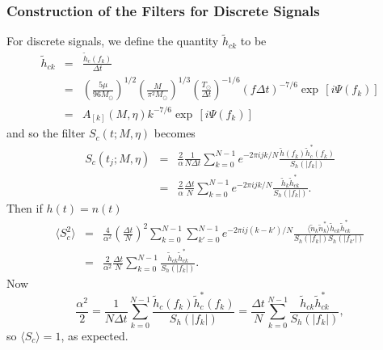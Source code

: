 \subsubsection*{Construction of the Filters for Discrete Signals}

For discrete signals, we define the quantity $\tilde{h}_{ck}$ to be
\begin{eqnarray}
\nonumber
\tilde{h}_{ck} &=& \frac{\tilde{h}_c(f_k)}{\Delta t} \\
\nonumber
&=& 
\left(\frac{5\mu}{96M_\odot}\right)^{1/2}
\left(\frac{M}{\pi^2M_\odot}\right)^{1/3}
\left(\frac {T_\odot}{\Delta t}\right)^{-1/6}
\left(f \Delta t\right)^{-7/6}
\exp\,[i\Psi(f_k)]\\
&=&  
A_{[k]}(M,\eta) k^{-7/6} \exp\,[i\Psi(f_k)]
\end{eqnarray}
and so the filter $S_c(t;M,\eta)$ becomes
\begin{eqnarray}
\nonumber
S_c(t_j;M,\eta) &=& \frac{2}{\alpha} \frac{1}{N\Delta t}
  \sum_{k=0}^{N-1} e^{-2\pi ijk/N} 
  \frac{\tilde{h}(f_k) \tilde{h}^\ast_c(f_k)}{S_h(|f_k|)} \\
&=& \frac{2}{\alpha} \frac{\Delta t}{N}
  \sum_{k=0}^{N-1} e^{-2\pi ijk/N} 
  \frac{\tilde{h}_k \tilde{h}^\ast_{ck}}{S_h(|f_k|)}.
\end{eqnarray}
Then if $h(t) = n(t)$
\begin{eqnarray}
\nonumber
\langle S_c^2 \rangle &=& 
  \frac{4}{\alpha^2} \left(\frac{\Delta t}{N}\right)^2
  \sum_{k=0}^{N-1} \sum_{k'=0}^{N-1} 
  e^{-2\pi ij(k-k')/N}
  \frac{ \langle \tilde{n}_k \tilde{n}^\ast_k \rangle
     \tilde{h}_{ck} \tilde{h}^\ast_{ck}}
       { S_h(|f_k|) S_h(|f_{k'}|) } \\
 &=& \frac{2}{\alpha^2} \frac{\Delta t}{N}
      \sum_{k=0}^{N-1} \frac{ \tilde{h}_{ck} \tilde{h}^\ast_{ck}}
       { S_h(|f_k|) }. 
\end{eqnarray}
Now
\begin{equation}
\frac{\alpha^2}{2} = \frac{1}{N\Delta t} \sum_{k=0}^{N-1} 
   \frac{\tilde{h}_c(f_k) \tilde{h}^\ast_c(f_k)}{S_h(|f_k|)} 
= \frac{\Delta t}{N} \sum_{k=0}^{N-1} 
   \frac{ \tilde{h}_{ck} \tilde{h}^\ast_{ck}}{ S_h(|f_k|) },
\end{equation}
so $\langle S_c \rangle = 1$, as expected.

